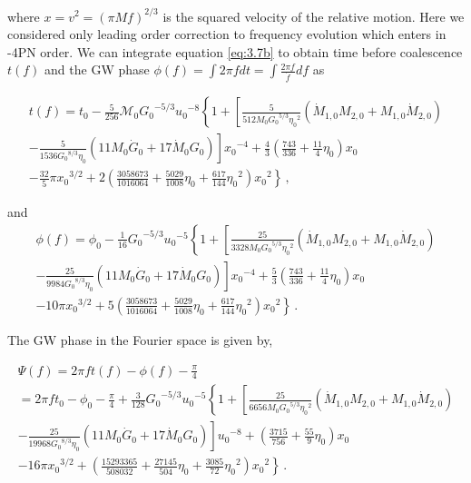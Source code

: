 \documentclass[11pt]{article}
\begin{document}
where $x=v^2=(\pi M f)^{2/3}$ is the squared velocity of the relative motion. Here we considered only leading order correction to frequency evolution which enters in -4PN order. We can integrate equation \eqref{eq:3.7b} to obtain time before coalescence $t(f)$ and the GW phase $\phi(f)=\int 2 \pi f dt=\int\frac{2\pi f}{\dot{f}}df$ as


\begin{align}
t(f)=t_0-\frac{5}{256}\mathcal{M}_0{G_0}^{-5/3}{u_0}^{-8}\left\{1+\left[\frac{5}{512 {M}_0{G_0}^{5/3}{\eta_0}^2}(\dot{M}_{1,0}M_{2,0}+M_{1,0}\dot{M}_{2,0})\right. \right. \nonumber \\ \left. \left. -\frac{5}{1536{G_0}^{8/3}\eta_0}(11M_0\dot{G}_0+17\dot{M}_0 G_0)\right]{x_0}^{-4}+\frac{4}{3}\left(\frac{743}{336}+\frac{11}{4}{\eta_0}\right)x_0 \right. \nonumber\\ \left. -\frac{32}{5}\pi {x_0}^{3/2}+2\left(\frac{3058673}{1016064}+\frac{5029}{1008}{\eta_0}+\frac{617}{144}{\eta_0}^2\right){x_0}^2 \right\}\,,
\end{align}


and
\begin{align}
\phi(f)=\phi_0-\frac{1}{16}{G_0}^{-5/3}{u_0}^{-5}\left\{1+\left[\frac{25}{3328 M_0 {G_0}^{5/3}{\eta_0}^2}(\dot{M}_{1,0}M_{2,0}+M_{1,0}\dot{M}_{2,0}) \right. \right. \nonumber\\ \left. \left. -\frac{25}{9984{G_0}^{8/3} \eta_0}(11M_0 \dot{G}_0+17\dot{M}_0 G_0)\right]{x_0}^{-4}+\frac{5}{3}\left(\frac{743}{336}+\frac{11}{4}{\eta_0}\right){x_0} \right. \nonumber\\ \left. -10 \pi {x_0}^{3/2}+5\left(\frac{3058673}{1016064}+\frac{5029}{1008}{\eta_0}+\frac{617}{144}{\eta_0}^{2}\right){x_0}^2\right\}\,.
\end{align}


\hspace{15.5pt}The GW phase in the Fourier space is given by,


\begin{align}\label{eq:3.7c}
\Psi(f)=2\pi ft(f)-\phi(f)-\frac{\pi}{4}\nonumber\\
=2\pi f t_0-\phi_0-\frac{\pi}{4}+\frac{3}{128}{G_0}^{-5/3}{u_0}^{-5}\left\{1+\left[\frac{25}{6656M_0 {G_0}^{5/3}{\eta_0}^2}(\dot{M}_{1,0}M_{2,0}+M_{1,0}\dot{M}_{2,0}) \right. \right. \nonumber\\ \left. \left. -\frac{25}{19968{G_0}^{8/3}\eta_0}(11M_0\dot{G}_0+17\dot{M}_0G_0)\right]{u_0}^{-8}+\left(\frac{3715}{756} +\frac{55}{9}{\eta_0}\right){x_0} \right. \nonumber\\ \left. -16\pi {x_0}^{3/2}+\left(\frac{15293365}{508032}+\frac{27145}{504}{\eta_0}+\frac{3085}{72}{\eta_0}^2\right){x_0}^2\right\}\,.
\end{align}
\end{document}
